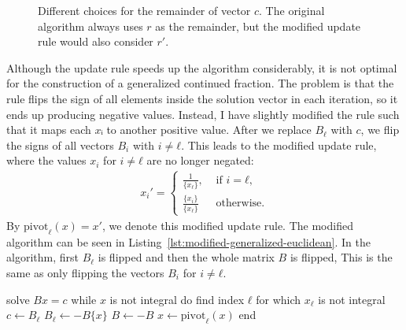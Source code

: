 

\begin{figure}[tbp]
  \centering
  
  \caption{
    Different choices for the remainder of vector $c$. The original algorithm
    always uses $r$ as the remainder, but the modified update rule would also consider $r'$.}
\end{figure}

Although the update rule speeds up the algorithm considerably, it is not
optimal for the construction of a generalized continued fraction.
The problem is that the rule flips the sign of all elements inside the solution
vector in each iteration, so it ends up producing negative values.
Instead, I have slightly modified the rule such that it maps each $xᵢ$ to
another positive value.
After we replace $B_ℓ$ with $c$, we flip the signs of all vectors $B_i$ with $i ≠ ℓ$.
This leads to the modified update rule, where the values $x_i$ for $i ≠ ℓ$ are
no longer negated:
\begin{align*}
  x_i' =
  \begin{cases}
    \frac{1}{\{x_ℓ\}},  & \text{ if } i = ℓ, \\
    \frac{\{x_i\}}{\{x_ℓ\}} & \text{ otherwise.}
  \end{cases}
\end{align*}
By $\mathrm{pivot}_ℓ(x) = x'$, we denote this modified update rule.
The modified algorithm can be seen in Listing~\ref{lst:modified-generalized-euclidean}.
In the algorithm, first $B_ℓ$ is flipped and then the whole matrix $B$ is flipped,
This is the same as only flipping the vectors $B_i$ for $i ≠ ℓ$.

\begin{Pseudocode}[float=tb, caption={The Modified Algorithm.}, label={lst:modified-generalized-euclidean}]
solve $Bx = c$
while $x$ is not integral do
  find index $ℓ$ for which $x_ℓ$ is not integral
  $c ← B_ℓ$
  $B_ℓ ← -B\{x\}$
  $B ← -B$
  $x ← \mathrm{pivot}_ℓ(x)$
end
\end{Pseudocode}

